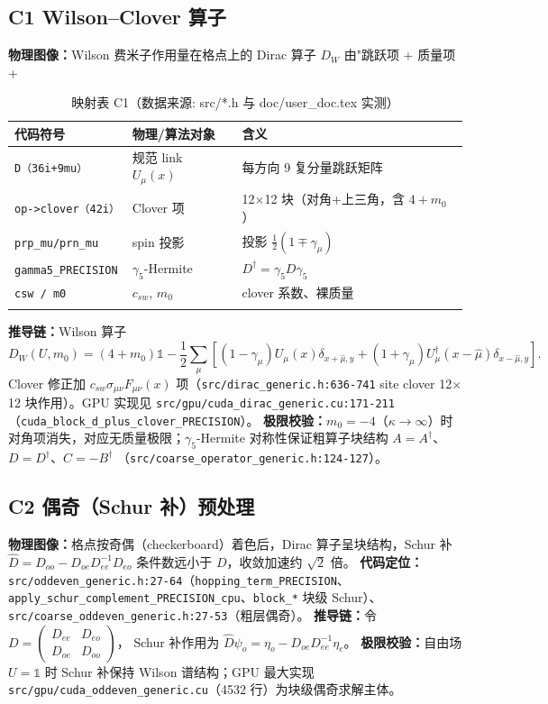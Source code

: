 \documentclass[UTF8]{ctexart}
\begin{document}
\subsection{C1 Wilson--Clover 算子}
\textbf{物理图像：}Wilson 费米子作用量在格点上的 Dirac 算子 $D_W$ 由"跳跃项 + 质量项 +
\begin{xltabular}{\textwidth}{lXX}
\toprule
\textcolor{map}{代码符号} & 物理/算法对象 & 含义 \\
\midrule
\endhead
\texttt{D（36i+9mu）} & 规范 link $U_\mu(x)$ & 每方向 9 复分量跳跃矩阵 \\
\texttt{op->clover（42i）} & Clover 项 & 12$\times$12 块（对角+上三角，含 $4+m_0$）\\
\texttt{prp\_mu/prn\_mu} & spin 投影 & 投影 $\frac12(1\mp\gamma_\mu)$ \\
\texttt{gamma5\_PRECISION} & $\gamma_5$-Hermite & $D^\dagger=\gamma_5 D\gamma_5$\\
\texttt{csw / m0} & $c_{sw}$, $m_0$ & clover 系数、裸质量 \\
\bottomrule
\caption{映射表 C1（数据来源: src/*.h 与 doc/user\_doc.tex 实测）}
\end{xltabular}
\textbf{推导链：}Wilson 算子
\begin{equation}\label{eq:wilson}
D_W(U,m_0) = (4+m_0)\mathbb{1} - \frac12 \sum_\mu\left[(1-\gamma_\mu)U_\mu(x)\delta_{x+\hat\mu,y} + (1+\gamma_\mu)U_\mu^\dagger(x-\hat\mu)\delta_{x-\hat\mu,y}\right].
\end{equation}
Clover 修正加 $c_{sw}\sigma_{\mu\nu}F_{\mu\nu}(x)$ 项（\nolinkurl{src/dirac_generic.h:636-741}
site clover 12$\times$12 块作用）。GPU 实现见 \nolinkurl{src/gpu/cuda_dirac_generic.cu:171-211}
（\nolinkurl{cuda_block_d_plus_clover_PRECISION}）。
\textbf{极限校验：}$m_0=-4$（$\kappa\to\infty$）时对角项消失，对应无质量极限；$\gamma_5$-Hermite
对称性保证粗算子块结构 $A=A^\dagger$、$D=D^\dagger$、$C=-B^\dagger$
（\nolinkurl{src/coarse_operator_generic.h:124-127}）。

\subsection{C2 偶奇（Schur 补）预处理}
\textbf{物理图像：}格点按奇偶（checkerboard）着色后，Dirac 算子呈块结构，Schur 补
$\hat D = D_{oo} - D_{oe}D_{ee}^{-1}D_{eo}$ 条件数远小于 $D$，收敛加速约 $\sqrt{2}$ 倍。
\textbf{代码定位：}\nolinkurl{src/oddeven_generic.h:27-64}（\texttt{hopping\_term\_PRECISION}、
\nolinkurl{apply_schur_complement_PRECISION_cpu}、\texttt{block\_*} 块级 Schur）、
\nolinkurl{src/coarse_oddeven_generic.h:27-53}（粗层偶奇）。
\textbf{推导链：}令 $D=\begin{pmatrix} D_{ee} & D_{eo}\\ D_{oe} & D_{oo}\end{pmatrix}$，
Schur 补作用为 $\hat D\psi_o = \eta_o - D_{oe}D_{ee}^{-1}\eta_e$。
\textbf{极限校验：}自由场 $U=\mathbb{1}$ 时 Schur 补保持 Wilson 谱结构；GPU 最大实现
\nolinkurl{src/gpu/cuda_oddeven_generic.cu}（4532 行）为块级偶奇求解主体。
\end{document}
